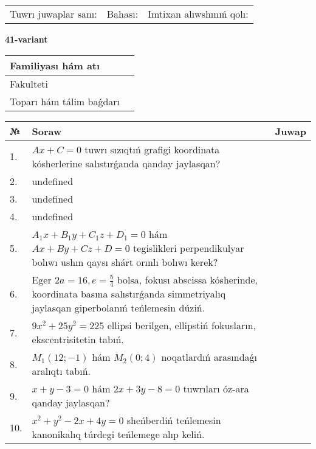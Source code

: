 \documentclass{article}
\begin{document}
\vspace{0.7cm}

\begin{tabular}{lll}
Tuwrı juwaplar sanı: \underline{\hspace{1cm}} & 
Bahası: \underline{\hspace{1cm}} & 
Imtixan alıwshınıń qolı: \underline{\hspace{2cm}} \\
\end{tabular}

\egroup

\newpage


\textbf{41-variant}\\

\bgroup
\def\arraystretch{1.6} %

\begin{tabular}{|m{5.7cm}|m{9.5cm}|}
\hline
Familiyası hám atı & \\
\hline
Fakulteti  & \\
\hline
Toparı hám tálim baǵdarı  & \\
\hline
\end{tabular}

\vspace{0.7cm}

\begin{tabular}{|m{0.7cm}|m{10cm}|m{4cm}|}
\hline
№ & Soraw & Juwap \\
\hline
1. & \(Ax + C = 0\) tuwrı sızıqtıń grafigi koordinata kósherlerine salıstırǵanda qanday jaylasqan? &  \\
\hline
2. & undefined &  \\
\hline
3. & undefined &  \\
\hline
4. & undefined &  \\
\hline
5. & \(A_{1}x + B_{1}y + C_{1}z + D_{1} = 0\) hám \(Ax + By + Cz + D = 0\) tegislikleri perpendikulyar bolıwı ushın qaysı shárt orınlı bolıwı kerek? &  \\
\hline
6. & Eger \(2 a = 16, e = \frac{5}{4}\) bolsa, fokusı abscissa kósherinde, koordinata basına salıstırǵanda simmetriyalıq jaylasqan giperbolanıń teńlemesin dúziń. &  \\
\hline
7. & \(9 x^{2} + 25 y^{2} = 225\) ellipsi berilgen, ellipstiń fokusların, ekscentrisitetin tabıń. &  \\
\hline
8. & \(M_{1} (12; - 1)\) hám \(M_{2} (0;4)\) noqatlardıń arasındaǵı aralıqtı tabıń. &  \\
\hline
9. & \(x + y - 3 = 0\) hám \(2 x + 3 y - 8 = 0\) tuwrıları óz-ara qanday jaylasqan? &  \\
\hline
10. & \(x^{2} + y^{2} - 2 x + 4 y = 0\) sheńberdiń teńlemesin kanonikalıq túrdegi teńlemege alıp keliń. & \\
\hline
\end{tabular}
\end{document}
